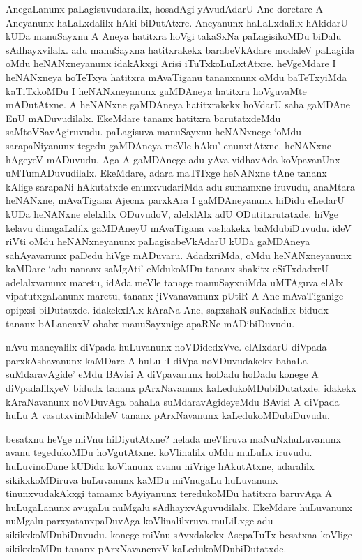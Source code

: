 AnegaLanunx paLagisuvudaralilx, hosadAgi yAvudAdarU Ane doretare A Aneyanunx haLaLxdalilx hAki biDutAtxre. Aneyanunx haLaLxdalilx hAkidarU kUDa manuSayxnu A Aneya hatitxra hoVgi takaSxNa paLagisikoMDu biDalu sAdhayxvilalx. adu manuSayxna hatitxrakekx barabeVkAdare modaleV paLagida oMdu heNANxneyanunx idakAkxgi Arisi iTuTxkoLuLxtAtxre. heVgeMdare I heNANxneya hoTeTxya hatitxra mAvaTiganu tananxnunx oMdu baTeTxyiMda kaTiTxkoMDu I heNANxneyanunx gaMDAneya hatitxra hoVguvaMte mADutAtxne. A heNANxne gaMDAneya hatitxrakekx hoVdarU saha gaMDAne EnU mADuvudilalx. EkeMdare tananx hatitxra barutatxdeMdu saMtoVSavAgiruvudu. paLagisuva manuSayxnu heNANxnege `oMdu sarapaNiyanunx tegedu gaMDAneya meVle hAku' enunxtAtxne. heNANxne hAgeyeV mADuvudu. Aga A gaMDAnege adu yAva vidhavAda koVpavanUnx uMTumADuvudilalx. EkeMdare, adara maTiTxge heNANxne tAne tananx kAlige sarapaNi hAkutatxde enunxvudariMda adu sumamxne iruvudu, anaMtara heNANxne, mAvaTigana Ajecnx parxkAra I gaMDAneyanunx hiDidu eLedarU kUDa heNANxne elelxlilx ODuvudoV, alelxlAlx adU ODutitxrutatxde. hiVge kelavu dinagaLalilx gaMDAneyU mAvaTigana vashakekx baMdubiDuvudu. ideV riVti oMdu heNANxneyanunx paLagisabeVkAdarU kUDa gaMDAneya sahAyavanunx paDedu hiVge mADuvaru. AdadxriMda, oMdu heNANxneyanunx kaMDare `adu nananx saMgAti' eMdukoMDu tananx shakitx eSiTxdadxrU adelalxvanunx maretu, idAda meVle tanage manuSayxniMda uMTAguva elAlx vipatutxgaLanunx maretu, tananx jiVvanavanunx pUtiR A Ane mAvaTiganige opipxsi biDutatxde. idakekxlAlx kAraNa Ane, sapxshaR suKadalilx bidudx tananx bALanenxV obabx manuSayxnige apaRNe mADibiDuvudu.

nAvu maneyalilx diVpada huLuvanunx noVDidedxVve. elAlxdarU diVpada parxkAshavanunx kaMDare A huLu `I diVpa noVDuvudakekx bahaLa suMdaravAgide' eMdu BAvisi A diVpavanunx hoDadu hoDadu konege A diVpadalilxyeV bidudx tananx pArxNavanunx kaLedukoMDubiDutatxde. idakekx kAraNavanunx noVDuvAga bahaLa suMdaravAgideyeMdu BAvisi A diVpada huLu A vasutxviniMdaleV tananx pArxNavanunx kaLedukoMDubiDuvudu.

besatxnu heVge miVnu hiDiyutAtxne? nelada meVliruva maNuNxhuLuvanunx avanu tegedukoMDu hoVgutAtxne. koVlinalilx oMdu muLuLx iruvudu. huLuvinoDane kUDida koVlanunx avanu niVrige hAkutAtxne, adaralilx sikikxkoMDiruva huLuvanunx kaMDu miVnugaLu huLuvanunx tinunxvudakAkxgi tamamx bAyiyanunx teredukoMDu hatitxra baruvAga A huLugaLanunx avugaLu nuMgalu sAdhayxvAguvudilalx. EkeMdare huLuvanunx nuMgalu parxyatanxpaDuvAga koVlinalilxruva muLiLxge adu sikikxkoMDubiDuvudu. konege miVnu sAvxdakekx AsepaTuTx besatxna koVlige sikikxkoMDu tananx pArxNavanenxV kaLedukoMDubiDutatxde.


